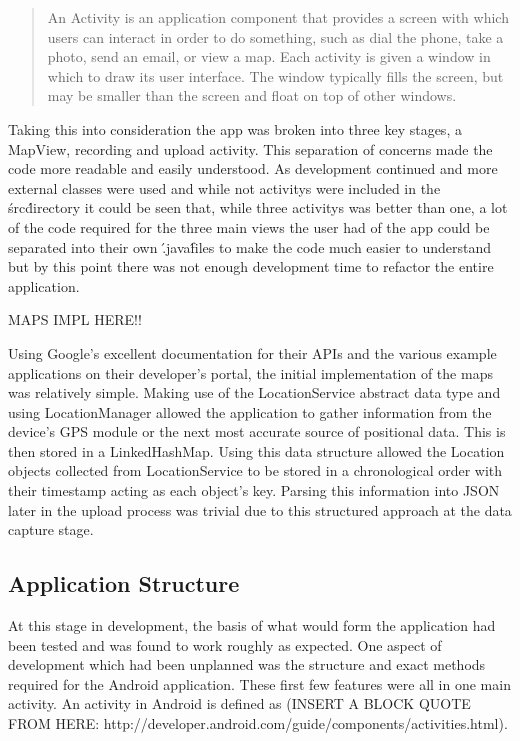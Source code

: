 \documentclass{l3proj}
\begin{document}
\blockquote{An Activity is an application component that provides a screen with which users can interact in order to do something, such as dial the phone, take a photo, send an email, or view a map. Each activity is given a window in which to draw its user interface. The window typically fills the screen, but may be smaller than the screen and float on top of other windows.}

Taking this into consideration the app was broken into three key stages, a MapView, recording and upload activity. This separation of concerns made the code more readable and easily understood. As development continued and more external classes were used and while not activitys were included in the \'src\' directory it could be seen that, while three activitys was better than one, a lot of the code required for the three main views the user had of the app could be separated into their own \'.java\' files to make the code much easier to understand but by this point there was not enough development time to refactor the entire application.








MAPS IMPL HERE!!

Using Google's excellent documentation for their APIs and the various example
applications on their developer's portal, the initial implementation of the maps
was relatively simple. Making use of the LocationService abstract data type and
using LocationManager allowed the application to gather information from the
device's GPS module or the next most accurate source of positional data. This is
then stored in a LinkedHashMap. Using this data structure allowed the Location
objects collected from LocationService to be stored in a chronological order
with their timestamp acting as each object's key. Parsing this information into
JSON later in the upload process was trivial due to this structured approach at
the data capture stage.

\subsection{Application Structure}
At this stage in development, the basis of what would form the application had been tested and was found to work roughly as expected. One aspect of development which had been unplanned was the structure and exact methods required for the Android application. These first few features were all in one main activity. An activity in Android is defined as (INSERT A BLOCK QUOTE FROM HERE:
http://developer.android.com/guide/components/activities.html).
\end{document}
